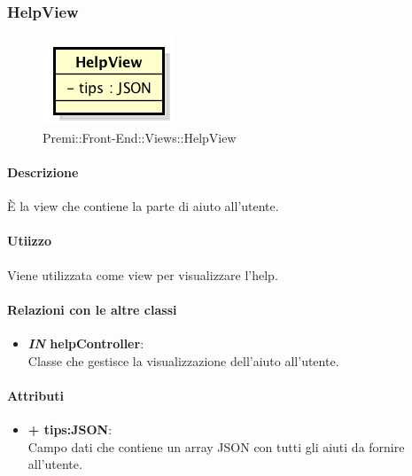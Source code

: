 \subsubsection{HelpView}
	\begin{figure}[h]
		\centering
		\includegraphics[width=0.4\linewidth]{img/premi_front_end_views_helpview}
		\caption[Premi::Front-End::Views::HelpView]{Premi::Front-End::Views::HelpView}
	\end{figure}
	
	\paragraph{Descrizione}
	È la view che contiene la parte di aiuto all'utente.
	
	\paragraph{Utiizzo}
	Viene utilizzata come view per visualizzare l'help.
	
	\paragraph{Relazioni con le altre classi}
	\begin{itemize}
		\item \textbf{\textit{IN} helpController}:\\
		Classe che gestisce la visualizzazione dell'aiuto all'utente.
	\end{itemize}
	
	\paragraph{Attributi}
	\begin{itemize}
		\item \textbf{+ tips:JSON}: \\
		Campo dati che contiene un array JSON con tutti gli aiuti da fornire all'utente.
	\end{itemize}
	
	
